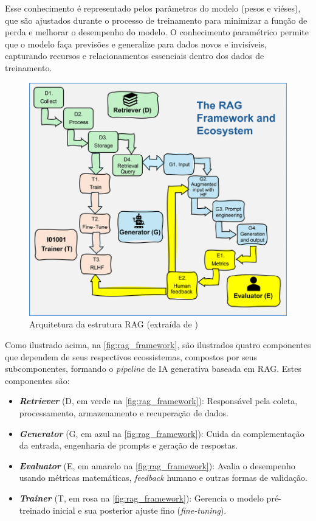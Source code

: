 \documentclass[a4paper, 12pt]{article}
\newcommand{\citeb}[1]{\bibleftbracket\cite{#1}\bibrightbracket}
\begin{document}
    Esse conhecimento é representado pelos parâmetros do modelo (pesos e viéses), que são ajustados durante o processo de treinamento para minimizar a função de perda e melhorar o desempenho do modelo. O conhecimento paramétrico permite que o modelo faça previsões e generalize para dados novos e invisíveis, capturando recursos e relacionamentos essenciais dentro dos dados de treinamento.

    \clearpage

    \begin{figure}[ht]
        \includegraphics[width=\textwidth,height=0.9\textheight,keepaspectratio]{rag-framework-ecosystem-denis-rothman.png}
        \centering
        \caption{Arquitetura da estrutura RAG (extraída de \citeb{rothman})}
        \centering
        \label{fig:rag_framework}
    \end{figure}

    Como ilustrado acima, na \autoref{fig:rag_framework}, são ilustrados quatro componentes que dependem de seus respectivos ecossistemas, compostos por seus subcomponentes, formando o \textit{pipeline} de IA generativa baseada em RAG. Estes componentes são: 
    
    \begin{itemize}
        \item \textbf{\textit{Retriever}} (D, em verde na \autoref{fig:rag_framework}): Responsável pela coleta, processamento, armazenamento e recuperação de dados.
        \item \textbf{\textit{Generator}} (G, em azul na \autoref{fig:rag_framework}): Cuida da complementação da entrada, engenharia de prompts e geração de respostas.
        \item \textbf{\textit{Evaluator}} (E, em amarelo na \autoref{fig:rag_framework}): Avalia o desempenho usando métricas matemáticas, \textit{feedback} humano e outras formas de validação.
        \item \textbf{\textit{Trainer}} (T, em rosa na \autoref{fig:rag_framework}): Gerencia o modelo pré-treinado inicial e sua posterior ajuste fino (\textit{fine-tuning}).
    \end{itemize}
\end{document}
